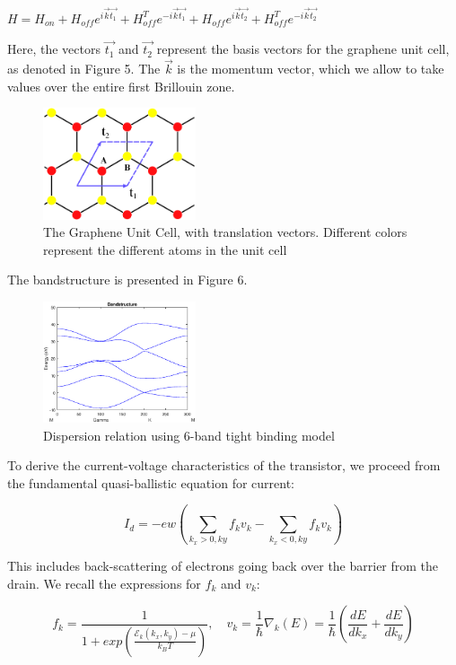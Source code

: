\documentclass[11pt]{article}
\begin{document}
$H = H_{on} + H_{off}e^{i\vec{k}\vec{t_1}} + H^T_{off}e^{-i\vec{k}\vec{t_1}} + H_{off}e^{i\vec{k}\vec{t_2}} + H^T_{off}e^{-i\vec{k}\vec{t_2}}$

Here, the vectors $\vec{t_1}$ and $\vec{t_2}$ represent the basis vectors for the graphene unit cell, as denoted in Figure 5. The $\vec{k}$ is the momentum vector, which we allow to take values over the entire first Brillouin zone. 

\begin{figure}[h!]
\centering
\includegraphics[width=0.4\textwidth]{graphene_unit_cell.png}
\caption{The Graphene Unit Cell, with translation vectors. Different colors represent the different atoms in the unit cell}
\end{figure}

The bandstructure is presented in Figure 6.

\begin{figure}[h!]
\centering
\includegraphics[width=0.4\textwidth]{Bandstructure.eps}
\caption{Dispersion relation using 6-band tight binding model}
\end{figure}

To derive the current-voltage characteristics of the transistor, we proceed from the fundamental quasi-ballistic equation for current:

$$I_d = -ew(\sum_{k_x>0, ky}f_{k}v_{k} - \sum_{k_x<0, ky}f_{k}v_{k})$$

This includes back-scattering of electrons going back over the barrier from the drain. We recall the expressions for $f_{k}$ and $v_{k}$:

$$f_{k}=\frac{1}{1+exp(\frac{\mathcal{E}_{k}(k_x,k_y) - \mu}{k_BT})}, \hspace{1em} v_{k} = \frac{1}{\hbar}\nabla_k(E)= \frac{1}{\hbar}(\frac{dE}{dk_x}+\frac{dE}{dk_y})$$
\end{document}
